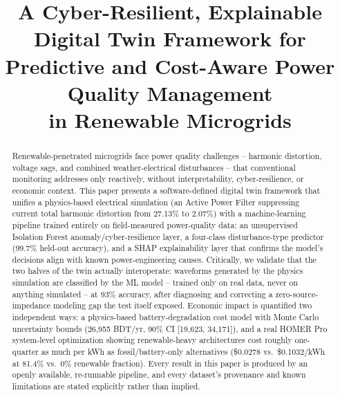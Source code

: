 \documentclass[conference]{IEEEtran}
\begin{document}
\title{A Cyber-Resilient, Explainable Digital Twin Framework for\\
Predictive and Cost-Aware Power Quality Management\\
in Renewable Microgrids}

\author{
}

\maketitle

\begin{abstract}
Renewable-penetrated microgrids face power quality challenges --
harmonic distortion, voltage sags, and combined weather-electrical
disturbances -- that conventional monitoring addresses only
reactively, without interpretability, cyber-resilience, or economic
context. This paper presents a software-defined digital twin
framework that unifies a physics-based electrical simulation (an
Active Power Filter suppressing current total harmonic distortion
from 27.13\% to 2.07\%) with a machine-learning pipeline trained
entirely on field-measured power-quality data: an unsupervised
Isolation Forest anomaly/cyber-resilience layer, a four-class
disturbance-type predictor (99.7\% held-out accuracy), and a SHAP
explainability layer that confirms the model's decisions align with
known power-engineering causes. Critically, we validate that the two
halves of the twin actually interoperate: waveforms generated by the
physics simulation are classified by the ML model -- trained only on
real data, never on anything simulated -- at 93\% accuracy, after
diagnosing and correcting a zero-source-impedance modeling gap the
test itself exposed. Economic impact is quantified two independent
ways: a physics-based battery-degradation cost model with Monte Carlo
uncertainty bounds (26,955 BDT/yr, 90\% CI [19,623, 34,171]), and a
real HOMER Pro system-level optimization showing renewable-heavy
architectures cost roughly one-quarter as much per kWh as
fossil/battery-only alternatives (\$0.0278 vs.\ \$0.1032/kWh at 81.4\%
vs.\ 0\% renewable fraction). Every result in this paper is produced
by an openly available, re-runnable pipeline, and every dataset's
provenance and known limitations are stated explicitly rather than
implied.
\end{abstract}
\end{document}
